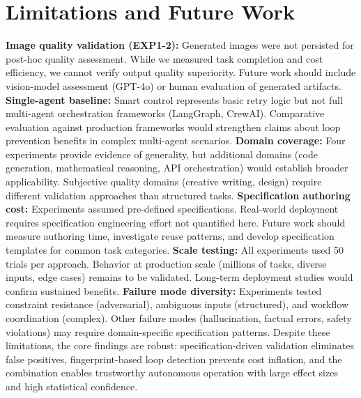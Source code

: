 \documentclass{article}
\begin{document}
\section{Limitations and Future Work}
\textbf{Image quality validation (EXP1-2):} Generated images were not persisted for post-hoc quality assessment. While we measured task completion and cost efficiency, we cannot verify output quality superiority. Future work should include vision-model assessment (GPT-4o) or human evaluation of generated artifacts.
\textbf{Single-agent baseline:} Smart control represents basic retry logic but not full multi-agent orchestration frameworks (LangGraph, CrewAI). Comparative evaluation against production frameworks would strengthen claims about loop prevention benefits in complex multi-agent scenarios.
\textbf{Domain coverage:} Four experiments provide evidence of generality, but additional domains (code generation, mathematical reasoning, API orchestration) would establish broader applicability. Subjective quality domains (creative writing, design) require different validation approaches than structured tasks.
\textbf{Specification authoring cost:} Experiments assumed pre-defined specifications. Real-world deployment requires specification engineering effort not quantified here. Future work should measure authoring time, investigate reuse patterns, and develop specification templates for common task categories.
\textbf{Scale testing:} All experiments used 50 trials per approach. Behavior at production scale (millions of tasks, diverse inputs, edge cases) remains to be validated. Long-term deployment studies would confirm sustained benefits.
\textbf{Failure mode diversity:} Experiments tested constraint resistance (adversarial), ambiguous inputs (structured), and workflow coordination (complex). Other failure modes (hallucination, factual errors, safety violations) may require domain-specific specification patterns.
Despite these limitations, the core findings are robust: specification-driven validation eliminates false positives, fingerprint-based loop detection prevents cost inflation, and the combination enables trustworthy autonomous operation with large effect sizes and high statistical confidence.

\end{document}
